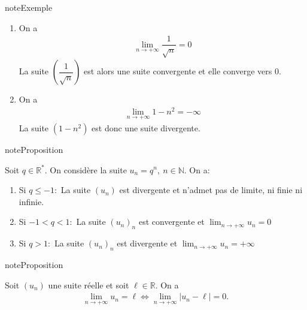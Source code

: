 \documentclass[letterpaper,10pt,french]{jupyterBook}
\begin{document}
\begin{sphinxadmonition}{note}{Exemple}
\begin{enumerate}
%
\item {} 
\sphinxAtStartPar
On a
\begin{equation*}
\begin{split}
    \lim_{n \rightarrow +\infty} \dfrac{1}{\sqrt{n}}=0
    \end{split}
\end{equation*}
\sphinxAtStartPar
La suite \((\dfrac{1}{\sqrt{n}})\) est alors une suite convergente et elle converge vers 0.

\item {} 
\sphinxAtStartPar
On a
\begin{equation*}
\begin{split}
    \lim_{n \rightarrow +\infty} 1-n^2=-\infty
    \end{split}
\end{equation*}
\sphinxAtStartPar
La suite \((1-n^2)\) est donc une suite divergente.

\end{enumerate}
\end{sphinxadmonition}

\begin{sphinxadmonition}{note}{Proposition}

\sphinxAtStartPar
Soit \(q\in \mathbb{R}^{*}.\) On considère la suite \(u_n=q^n,\:n\in \mathbb{N}.\) On a:
\begin{enumerate}
%
\item {} 
\sphinxAtStartPar
Si \(q\leq-1:\) La suite \((u_n)\) est divergente et n’admet pas de limite, ni finie ni infinie.

\item {} 
\sphinxAtStartPar
Si \(-1<q<1:\) La suite \((u_n)_n\) est convergente et \(\lim_{n \rightarrow +\infty}u_n=0\)

\item {} 
\sphinxAtStartPar
Si \(q>1:\) La suite \((u_n)_n\) est divergente et \(\lim_{n \rightarrow +\infty}u_n=+\infty\)

\end{enumerate}
\end{sphinxadmonition}

\begin{sphinxadmonition}{note}{Proposition}

\sphinxAtStartPar
Soit \((u_n)\) une suite réelle et soit \(\ell\in \mathbb{R}.\) On a
\begin{equation*}
\begin{split}
\lim_{n \rightarrow +\infty}u_n=\ell\Leftrightarrow \lim_{n \rightarrow +\infty}|u_n-\ell|=0.
\end{split}
\end{equation*}\end{sphinxadmonition}
\end{document}
